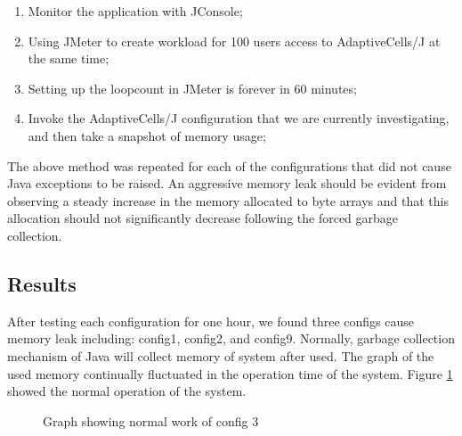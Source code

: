 \begin{enumerate}
 \item Monitor the application with JConsole;
 \item Using JMeter to create workload for 100 users access to AdaptiveCells/J at the same time;
 \item Setting up the loopcount in JMeter is forever in 60 minutes;
 \item Invoke the AdaptiveCells/J configuration that we are currently investigating, and then take a snapshot of memory usage;
\end{enumerate}

The above method was repeated for each of the configurations that did not cause Java exceptions to be raised. An aggressive memory leak should be evident from observing a steady increase in the memory allocated to byte arrays and that this allocation should not significantly decrease following the forced garbage collection.

\subsection{Results}

After testing each configuration for one hour, we found three configs cause memory leak including: config1, config2, and config9. Normally, garbage collection mechanism of Java will collect memory of system after used. The graph of the used memory continually fluctuated in the operation time of the system. Figure \ref{config3} showed the normal operation of the system. 

\begin{figure}[ht]
 \centering
 \caption{Graph showing normal work of config 3}
 \label{config3}
\end{figure}

